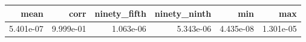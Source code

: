 \begin{tabular}{rrrrrr}
\toprule
mean & corr & ninety_fifth & ninety_ninth & min & max \\
\midrule
5.401e-07 & 9.999e-01 & 1.063e-06 & 5.343e-06 & 4.435e-08 & 1.301e-05 \\
\bottomrule
\end{tabular}
